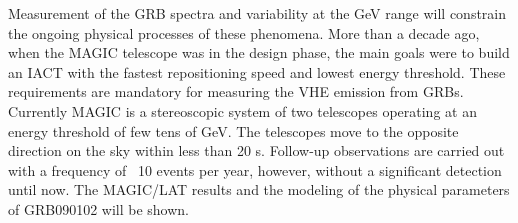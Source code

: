 


\bigskip



\bigskip

\noindent Measurement of the GRB spectra and variability at the GeV range will constrain the ongoing physical processes of these phenomena. More than a decade ago, when the MAGIC telescope was in the design phase, the main goals were to build an IACT with the fastest repositioning speed and lowest energy threshold. These requirements are mandatory for measuring the VHE emission from GRBs. Currently MAGIC is a stereoscopic system of two telescopes operating at an energy threshold of few tens of GeV. The telescopes move to the opposite direction on the sky within less than 20 s. Follow-up observations are carried out with a frequency of ~10 events per year, however, without a significant detection until now. The MAGIC/LAT results and the modeling of the physical parameters of GRB090102 will be shown.
